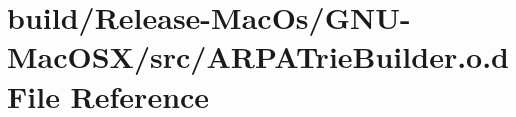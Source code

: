 \hypertarget{_release-_mac_os_2_g_n_u-_mac_o_s_x_2src_2_a_r_p_a_trie_builder_8o_8d}{}\section{build/\+Release-\/\+Mac\+Os/\+G\+N\+U-\/\+Mac\+O\+S\+X/src/\+A\+R\+P\+A\+Trie\+Builder.o.\+d File Reference}
\label{_release-_mac_os_2_g_n_u-_mac_o_s_x_2src_2_a_r_p_a_trie_builder_8o_8d}
